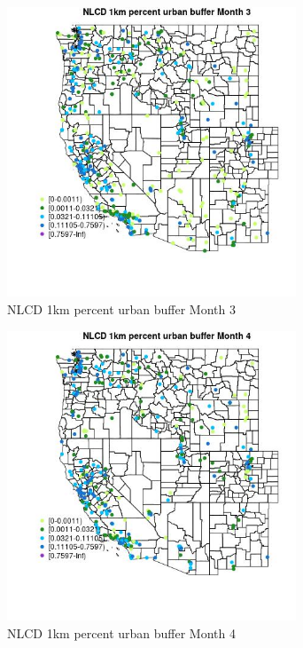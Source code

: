 \begin{figure} 
\centering  
\includegraphics[width=0.77\textwidth]{Code_Outputs/Report_ML_input_PM25_Step4_part_e_de_duplicated_aves_compiled_2019-05-18wNAs_MapObsMo3NLCD_1km_percent_urban_buffer.jpg} 
\caption{\label{fig:Report_ML_input_PM25_Step4_part_e_de_duplicated_aves_compiled_2019-05-18wNAsMapObsMo3NLCD_1km_percent_urban_buffer}NLCD 1km percent urban buffer Month 3} 
\end{figure} 
 

\clearpage 

\begin{figure} 
\centering  
\includegraphics[width=0.77\textwidth]{Code_Outputs/Report_ML_input_PM25_Step4_part_e_de_duplicated_aves_compiled_2019-05-18wNAs_MapObsMo4NLCD_1km_percent_urban_buffer.jpg} 
\caption{\label{fig:Report_ML_input_PM25_Step4_part_e_de_duplicated_aves_compiled_2019-05-18wNAsMapObsMo4NLCD_1km_percent_urban_buffer}NLCD 1km percent urban buffer Month 4} 
\end{figure} 
 

